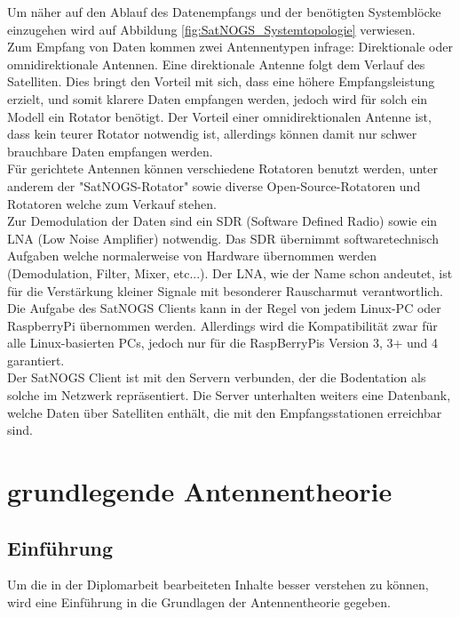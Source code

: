 Um näher auf den Ablauf des Datenempfangs und der benötigten Systemblöcke einzugehen wird auf Abbildung \ref{fig:SatNOGS_Systemtopologie} verwiesen.\\

Zum Empfang von Daten kommen zwei Antennentypen infrage: Direktionale oder omnidirektionale Antennen. Eine direktionale Antenne folgt dem Verlauf des Satelliten. Dies bringt den Vorteil mit sich, dass eine höhere Empfangsleistung erzielt, und somit klarere Daten empfangen werden, jedoch wird für solch ein Modell ein Rotator benötigt. Der Vorteil einer omnidirektionalen Antenne ist, dass kein teurer Rotator notwendig ist, allerdings können damit nur schwer brauchbare Daten empfangen werden.\\

Für gerichtete Antennen können verschiedene Rotatoren benutzt werden, unter anderem der "SatNOGS-Rotator" sowie diverse Open-Source-Rotatoren und Rotatoren welche zum Verkauf stehen.\\

Zur Demodulation der Daten sind ein SDR (Software Defined Radio) sowie ein LNA (Low Noise Amplifier) notwendig. Das SDR übernimmt softwaretechnisch Aufgaben welche normalerweise von Hardware übernommen werden (Demodulation, Filter, Mixer, etc...). Der LNA, wie der Name schon andeutet, ist für die Verstärkung kleiner Signale mit besonderer Rauscharmut verantwortlich. \\

Die Aufgabe des SatNOGS Clients kann in der Regel von jedem Linux-PC oder RaspberryPi übernommen werden. Allerdings wird die Kompatibilität zwar für alle Linux-basierten PCs, jedoch nur für die RaspBerryPis Version 3, 3+ und 4 garantiert.\\

Der SatNOGS Client ist mit den Servern verbunden, der die Bodentation als solche im Netzwerk repräsentiert. Die Server unterhalten weiters eine Datenbank, welche Daten über Satelliten enthält, die mit den Empfangsstationen erreichbar sind.
\pagebreak

\section{grundlegende Antennentheorie}
\subsection{Einführung}
Um die in der Diplomarbeit bearbeiteten Inhalte besser verstehen zu können, wird eine Einführung in die Grundlagen der Antennentheorie gegeben. 

